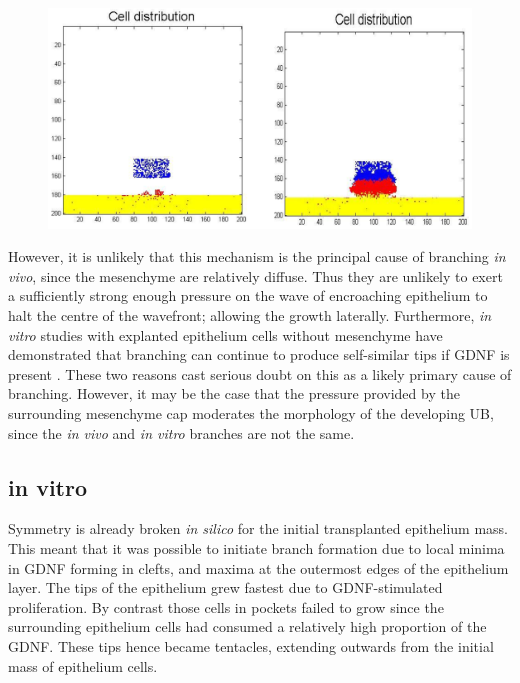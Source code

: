 \documentclass[pdftex,10pt,a4paper,twocolumn]{article}
\begin{document}
\begin{figure}[t] 
\centering
\scalebox{0.5} 
{\includegraphics{bifucations.eps}}
\caption{}\label{fig:bifurcations}
\end{figure} 


However, it is unlikely that this mechanism is the principal cause of branching \textit{in vivo}, since the mesenchyme are relatively diffuse. Thus they are unlikely to exert a sufficiently strong enough pressure on the wave of encroaching epithelium to halt the centre of the wavefront; allowing the growth laterally. Furthermore, \textit{in vitro} studies with explanted epithelium cells without mesenchyme have demonstrated that branching can continue to produce self-similar tips if GDNF is present \cite{qiao1999branching}. These two reasons cast serious doubt on this as a likely primary cause of branching. However, it may be the case that the pressure provided by the surrounding mesenchyme cap moderates the morphology of the developing UB, since the \textit{in vivo} and \textit{in vitro} branches are not the same.

\subsection{in vitro}
Symmetry is already broken \textit{in silico} for the initial transplanted epithelium mass. This meant that it was possible to initiate branch formation due to local minima in GDNF forming in clefts, and maxima at the outermost edges of the epithelium layer. The tips of the epithelium grew fastest due to GDNF-stimulated proliferation. By contrast those cells in pockets failed to grow since the surrounding epithelium cells had consumed a relatively high proportion of the GDNF. These tips hence became tentacles, extending outwards from the initial mass of epithelium cells.
\end{document}
